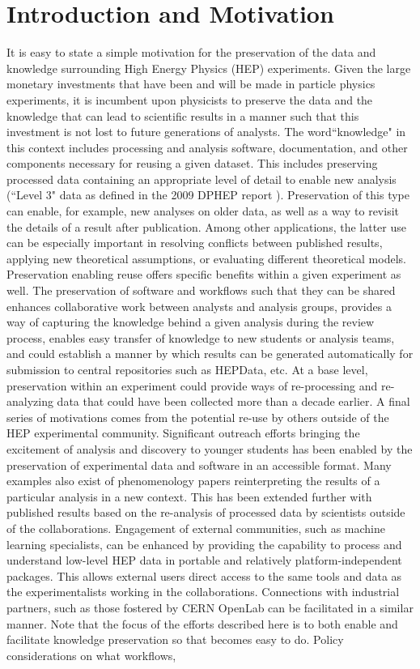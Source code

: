 \documentclass[12pt,a4paper]{article}
\begin{document}
\hypertarget{introduction}{%
\section{Introduction and Motivation}\label{introduction}}
It is easy to state a simple motivation for the preservation of the data and knowledge surrounding High Energy Physics (HEP) experiments. Given the large monetary investments that have been and will be made in particle physics experiments, it is incumbent upon physicists to preserve the data and the knowledge that can lead to scientific results in a manner such that this investment is not lost to future generations of analysts.  The word``knowledge" in this context includes processing and analysis software, documentation, and other components necessary for reusing a given dataset. This includes preserving processed data containing an appropriate level of detail to enable new analysis (``Level 3" data as defined in the 2009 DPHEP report\cite{DPHEP09} ). Preservation of this type can enable, for example, new analyses on older data, as well as a way to revisit the details of a result after publication.  Among other applications, the latter use can be especially important in resolving conflicts between published results, applying new theoretical assumptions, or evaluating different theoretical models.  Preservation enabling reuse offers specific benefits within a given experiment as well.  The preservation of software and workflows such that they can be shared enhances collaborative work between analysts and analysis groups, provides a way of capturing the knowledge behind a given analysis during the review process, enables easy transfer of knowledge to new students or analysis teams, and could establish a manner by which results can be generated automatically for submission to central repositories such as HEPData\cite{HEPDATA}, etc.  At a base level, preservation within an experiment could provide ways of re-processing and re-analyzing data that could have been collected more than a decade earlier. A final series of motivations comes from the potential re-use by others outside of the HEP experimental community.  Significant outreach efforts bringing the excitement of analysis and discovery to younger students has been enabled by the preservation of experimental data and software in an accessible format.  Many examples also exist of phenomenology papers reinterpreting the results of a particular analysis in a new context.  This has been extended further with published results based on the re-analysis of processed data by scientists outside of the collaborations\cite{MITQCD}.  Engagement of external communities, such as machine learning specialists, can be enhanced by providing the capability to process and understand low-level HEP data in portable and relatively platform-independent packages. This allows external users direct access to the same tools and data as the experimentalists working in the collaborations.  Connections with industrial partners, such as those fostered by CERN OpenLab\cite{Openlab} can be facilitated in a similar manner.  Note that the focus of the efforts described here is to both enable and facilitate knowledge preservation so that becomes easy to do.  Policy considerations on what workflows, 
\end{document}
